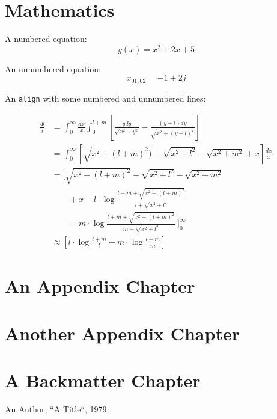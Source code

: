 \documentclass[a4paper,11pt,oneside,showtrims]{alpenthesis}
\begin{document}
\tikzset{external/export next=false}%
\begin{tcolorbox}
    \lipsum[2]
\end{tcolorbox}

\chapter{Mathematics}

A numbered equation:
\begin{equation}
    y(x) = x^2 + 2x + 5
\end{equation}

An unnumbered equation:
\begin{equation*}
    x_{01,02} = -1 \pm 2j
\end{equation*}

An \verb|align| with some numbered and unnumbered lines:

\begin{align}
    \frac{\Phi}{i}
    & =
    \int_{0}^{\infty} \frac{dx}{x} \int_{0}^{l+m}
    \left[
        \frac{y dy}{\sqrt{x^2+y^2}} - \frac{(y-l) dy}{\sqrt{x^2+(y-l)^2}}
    \right]
    \nonumber
    \\
    &=
    \int_{0}^{\infty}
    \left[
        \sqrt{x^2 + (l+m)^2)} - \sqrt{x^2+l^2} - \sqrt{x^2+m^2}+x
    \right]
    \frac{dx}{x}
    \nonumber
    \\
    &=
    \Bigg[
        \sqrt{x^2 + (l+m)^2} - \sqrt{x^2+l^2} - \sqrt{x^2+m^2}
        \nonumber
        \\
        & ~~~~~~~~~   + x - l \cdot \log{\frac{l+m+\sqrt{x^2+(l+m)^2}}{l+\sqrt{x^2+l^2}}}
        \nonumber
        \\
        & ~~~~~~~~~   - m \cdot \log{\frac{l+m+\sqrt{x^2+(l+m)^2}}{m+\sqrt{x^2+l^2}}} ~
    \Bigg]_0^{\infty}
    \label{eq:mISL:2}
    \\
    & \approx
    \left[ l \cdot \log{\frac{l+m}{l}} + m \cdot \log{\frac{l+m}{m}} \right]
    \label{eq:mISL:3}
\end{align}

\appendix{}
\chapter{An Appendix Chapter}
\lipsum[1-3]

\chapter{Another Appendix Chapter}
\lipsum[4-6]

\backmatter
\chapter{A Backmatter Chapter}
\lipsum[7-9]

\begin{thebibliography}{1}
        An Author, ``A Title``, 1979.
\end{thebibliography}
\end{document}
